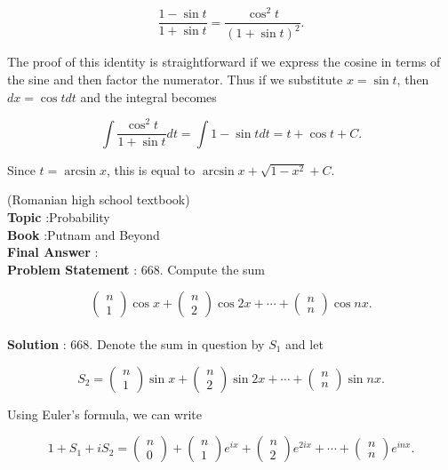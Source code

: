 \documentclass[10pt]{article}
\begin{document}
$$
\frac{1-\sin t}{1+\sin t}=\frac{\cos ^{2} t}{(1+\sin t)^{2}} .
$$

The proof of this identity is straightforward if we express the cosine in terms of the sine and then factor the numerator. Thus if we substitute $x=\sin t$, then $d x=\cos t d t$ and the integral becomes

$$
\int \frac{\cos ^{2} t}{1+\sin t} d t=\int 1-\sin t d t=t+\cos t+C .
$$

Since $t=\arcsin x$, this is equal to $\arcsin x+\sqrt{1-x^{2}}+C$.

(Romanian high school textbook)
\\
\textbf{Topic} :Probability\\
\textbf{Book} :Putnam and Beyond\\
\textbf{Final Answer} :\\


\textbf{Problem Statement} :
668. Compute the sum

$$
\left(\begin{array}{l}
n \\
1
\end{array}\right) \cos x+\left(\begin{array}{l}
n \\
2
\end{array}\right) \cos 2 x+\cdots+\left(\begin{array}{l}
n \\
n
\end{array}\right) \cos n x .
$$
\\
\textbf{Solution} :
668. Denote the sum in question by $S_{1}$ and let

$$
S_{2}=\left(\begin{array}{l}
n \\
1
\end{array}\right) \sin x+\left(\begin{array}{l}
n \\
2
\end{array}\right) \sin 2 x+\cdots+\left(\begin{array}{l}
n \\
n
\end{array}\right) \sin n x .
$$

Using Euler's formula, we can write

$$
1+S_{1}+i S_{2}=\left(\begin{array}{l}
n \\
0
\end{array}\right)+\left(\begin{array}{l}
n \\
1
\end{array}\right) e^{i x}+\left(\begin{array}{l}
n \\
2
\end{array}\right) e^{2 i x}+\cdots+\left(\begin{array}{l}
n \\
n
\end{array}\right) e^{i n x} .
$$
\end{document}
